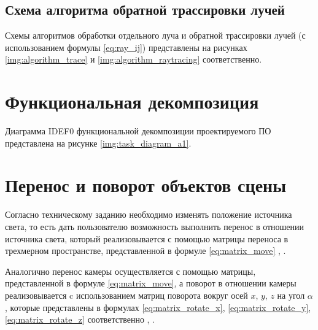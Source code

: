 

\clearpage

\subsection{Схема алгоритма обратной трассировки лучей}

Схемы алгоритмов обработки отдельного луча и обратной трассировки лучей (с использованием формулы \ref{eq:ray_ij}) представлены на рисунках \ref{img:algorithm_trace} и \ref{img:algorithm_raytracing} соответственно.



\clearpage

\section{Функциональная декомпозиция}

Диаграмма IDEF0 функциональной декомпозиции проектируемого ПО представлена на рисунке \ref{img:task_diagram_a1}.


\section{Перенос и поворот объектов сцены}

Согласно техническому заданию необходимо изменять положение источника света, то есть дать пользователю возможность выполнить перенос в отношении источника света, который реализовывается с помощью матрицы переноса в трехмерном пространстве, представленной в формуле \ref{eq:matrix_move} \cite{куров}, \cite{боресков}.

Аналогично перенос камеры осуществляется с помощью матрицы, представленной в формуле \ref{eq:matrix_move}, а поворот в отношении камеры реализовывается c использованием матриц поворота вокруг осей $x$, $y$, $z$ на угол $\alpha$, которые представлены в формулах \ref{eq:matrix_rotate_x}, \ref{eq:matrix_rotate_y}, \ref{eq:matrix_rotate_z} соответственно \cite{куров}, \cite{боресков}.

